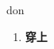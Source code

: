 
\begin{frame}
{\huge don}
\begin{center}
\begin{enumerate}\Large
  \item \textbf{穿上}
\end{enumerate}
\end{center}
\end{frame}
